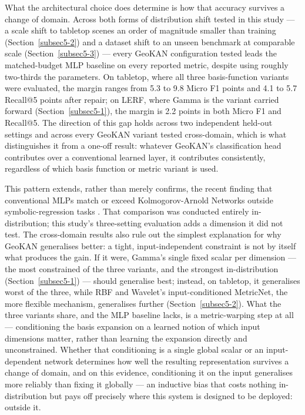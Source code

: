 \documentclass[sn-mathphys,Numbered]{sn-jnl}
\begin{document}
What the architectural choice does determine is how that accuracy survives a change of domain. Across both forms of distribution shift tested in this study --- a scale shift to tabletop scenes an order of magnitude smaller than training (Section~\ref{subsec5-2}) and a dataset shift to an unseen benchmark at comparable scale (Section~\ref{subsec5-3}) --- every GeoKAN configuration tested leads the matched-budget MLP baseline on every reported metric, despite using roughly two-thirds the parameters. On tabletop, where all three basis-function variants were evaluated, the margin ranges from 5.3 to 9.8 Micro F1 points and 4.1 to 5.7 Recall@5 points after repair; on LERF, where Gamma is the variant carried forward (Section~\ref{subsec5-1}), the margin is 2.2 points in both Micro F1 and Recall@5. The direction of this gap holds across two independent held-out settings and across every GeoKAN variant tested cross-domain, which is what distinguishes it from a one-off result: whatever GeoKAN's classification head contributes over a conventional learned layer, it contributes consistently, regardless of which basis function or metric variant is used.

This pattern extends, rather than merely confirms, the recent finding that conventional MLPs match or exceed Kolmogorov-Arnold Networks outside symbolic-regression tasks \cite{yu2024kanmlp}. That comparison was conducted entirely in-distribution; this study's three-setting evaluation adds a dimension it did not test. The cross-domain results also rule out the simplest explanation for why GeoKAN generalises better: a tight, input-independent constraint is not by itself what produces the gain. If it were, Gamma's single fixed scalar per dimension --- the most constrained of the three variants, and the strongest in-distribution (Section~\ref{subsec5-1}) --- should generalise best; instead, on tabletop, it generalises worst of the three, while RBF and Wavelet's input-conditioned MetricNet, the more flexible mechanism, generalises further (Section~\ref{subsec5-2}). What the three variants share, and the MLP baseline lacks, is a metric-warping step at all --- conditioning the basis expansion on a learned notion of which input dimensions matter, rather than learning the expansion directly and unconstrained. Whether that conditioning is a single global scalar or an input-dependent network determines how well the resulting representation survives a change of domain, and on this evidence, conditioning it on the input generalises more reliably than fixing it globally --- an inductive bias that costs nothing in-distribution but pays off precisely where this system is designed to be deployed: outside it.
\end{document}

